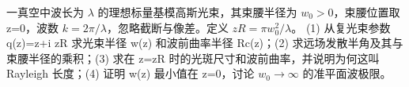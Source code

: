 一真空中波长为 \(\lambda \) 的理想标量基模高斯光束，其束腰半径为 \(w_{0}>0\)，束腰位置取 z=0，波数 \(k=2\pi /\lambda \)，忽略截断与像差。定义 \(zR=\pi w_{0}^{2}/\lambda \)。
(1) 从复光束参数 q(z)=z+i zR 求光束半径 w(z) 和波前曲率半径 Rc(z)；(2) 求远场发散半角及其与束腰半径的乘积；(3) 求在 z=zR 时的光斑尺寸和波前曲率，并说明为何这叫 Rayleigh 长度；(4) 证明 w(z) 最小值在 z=0，讨论 \(w_{0}\to \infty \) 的准平面波极限。
